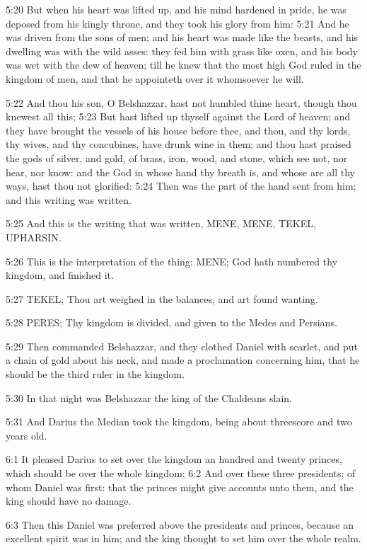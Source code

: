 5:20 But when his heart was lifted up, and his mind hardened in pride, he was deposed from his kingly throne, and they took his glory from him: 5:21 And he was driven from the sons of men; and his heart was made like the beasts, and his dwelling was with the wild asses: they fed him with grass like oxen, and his body was wet with the dew of heaven; till he knew that the most high God ruled in the kingdom of men, and that he appointeth over it whomsoever he will.

5:22 And thou his son, O Belshazzar, hast not humbled thine heart, though thou knewest all this; 5:23 But hast lifted up thyself against the Lord of heaven; and they have brought the vessels of his house before thee, and thou, and thy lords, thy wives, and thy concubines, have drunk wine in them; and thou hast praised the gods of silver, and gold, of brass, iron, wood, and stone, which see not, nor hear, nor know: and the God in whose hand thy breath is, and whose are all thy ways, hast thou not glorified: 5:24 Then was the part of the hand sent from him; and this writing was written.

5:25 And this is the writing that was written, MENE, MENE, TEKEL, UPHARSIN.

5:26 This is the interpretation of the thing: MENE; God hath numbered thy kingdom, and finished it.

5:27 TEKEL; Thou art weighed in the balances, and art found wanting.

5:28 PERES; Thy kingdom is divided, and given to the Medes and Persians.

5:29 Then commanded Belshazzar, and they clothed Daniel with scarlet, and put a chain of gold about his neck, and made a proclamation concerning him, that he should be the third ruler in the kingdom.

5:30 In that night was Belshazzar the king of the Chaldeans slain.

5:31 And Darius the Median took the kingdom, being about threescore and two years old.

6:1 It pleased Darius to set over the kingdom an hundred and twenty princes, which should be over the whole kingdom; 6:2 And over these three presidents; of whom Daniel was first: that the princes might give accounts unto them, and the king should have no damage.

6:3 Then this Daniel was preferred above the presidents and princes, because an excellent spirit was in him; and the king thought to set him over the whole realm.

